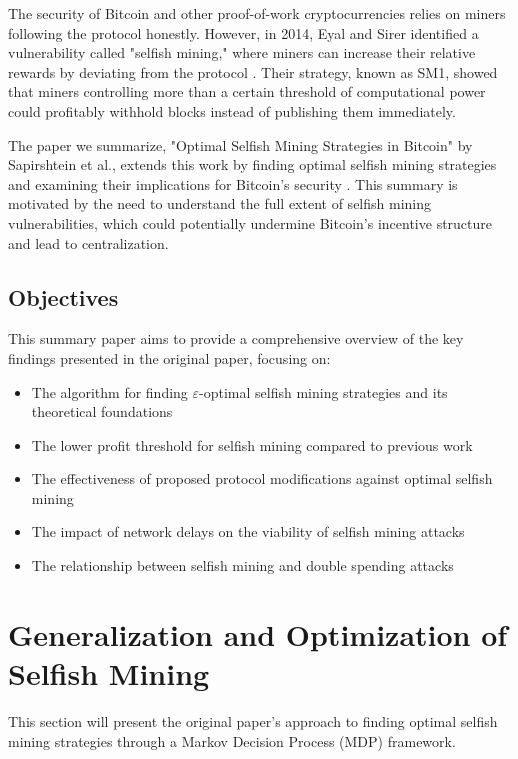 \documentclass[conference]{IEEEtran}
\begin{document}
The security of Bitcoin and other proof-of-work cryptocurrencies relies on miners following the protocol honestly. 
However, in 2014, Eyal and Sirer identified a vulnerability called "selfish mining," 
where miners can increase their relative rewards by deviating from the protocol \cite{eyal2018majority}. 
Their strategy, known as SM1, showed that miners controlling more than a certain threshold of computational power 
could profitably withhold blocks instead of publishing them immediately.

The paper we summarize, "Optimal Selfish Mining Strategies in Bitcoin" by Sapirshtein et al., extends this work by finding optimal selfish mining strategies and examining their implications for Bitcoin's security \cite{sapirshtein2016optimal}. This summary is motivated by the need to understand the full extent of selfish mining vulnerabilities, which could potentially undermine Bitcoin's incentive structure and lead to centralization.

\subsection{Objectives}

This summary paper aims to provide a comprehensive overview of the key findings presented in the original paper, focusing on:

\begin{itemize}
    \item The algorithm for finding $\varepsilon$-optimal selfish mining strategies and its theoretical foundations
    \item The lower profit threshold for selfish mining compared to previous work
    \item The effectiveness of proposed protocol modifications against optimal selfish mining
    \item The impact of network delays on the viability of selfish mining attacks
    \item The relationship between selfish mining and double spending attacks
\end{itemize}


\section{Generalization and Optimization of Selfish Mining}

This section will present the original paper's approach to finding optimal selfish mining strategies through a Markov Decision Process (MDP) framework.
\end{document}
